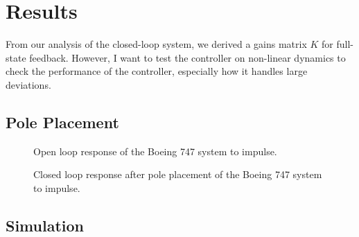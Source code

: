 \section{Results} \label{sec:results}

From our analysis of the closed-loop system, we derived a gains matrix
$K$ for full-state feedback. However, I want to test the controller on
non-linear dynamics to check the performance of the controller,
especially how it handles large deviations. 

\subsection{Pole Placement}

\begin{figure}[h]
  \caption{Open loop response of the Boeing 747 system to impulse.}
  \label{fig:openloop}
\end{figure}

\begin{figure}[h]
  \caption{Closed loop response after pole placement of the Boeing 747 system to impulse.}
  \label{fig:closeloop}
\end{figure}


\subsection{Simulation} \label{sec:sim}


